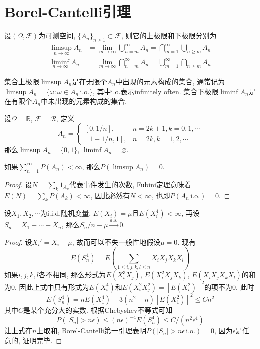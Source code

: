 \documentclass[cn, 12pt, math=mtpro2, bibstyle=apa, blue, twocol]{elegantbook}
\newcommand{\F}{\mathcal{F}}
\newcommand{\R}{\mathbb{R}}
\let\emptyset\varnothing
\begin{document}
\section{Borel-Cantelli引理}
\begin{definition}
设$(\Omega,\F)$为可测空间, $\{A_n\}_{n\ge1}\subset\F$, 则它的上极限和下极限分别为
\begin{align*}
\limsup_{n\to\infty} A_n&=\lim_{m\to\infty}\bigcup_{n=m}^\infty A_n=\bigcap_{m=1}^\infty\bigcup_{n\ge m}A_n \\
\liminf_{n\to\infty} A_n&=\lim_{m\to\infty}\bigcap_{n=m}^\infty A_n=\bigcup_{m=1}^\infty\bigcap_{n\ge m}A_n
\end{align*}
\end{definition}
集合上极限$\limsup A_n$是在无限个$A_n$中出现的元素构成的集合, 通常记为$\limsup A_n=\{\omega:\omega\in A_n\,\text{i.o.}\}$, 其中i.o.表示infinitely often. 集合下极限$\liminf A_n$是在有限个$A_n$中未出现的元素构成的集合.
\begin{example}
设$\Omega=\R$, $\F=\mathcal{R}$, 定义
$$A_n=\begin{cases}
        [0,1/n], & n=2k+1, k=0,1,\cdots \\
        [1-1/n,1], & n=2k, k=1,2,\cdots
      \end{cases}$$
那么$\limsup A_n=\{0,1\}$, $\liminf A_n=\emptyset$.
\end{example}
\begin{theorem}
  如果$\sum_{n=1}^{\infty}P(A_n)<\infty$, 那么$P(\limsup A_n)=0$.
\end{theorem}
\begin{proof}
  设$N=\sum_k1_{A_k}$代表事件发生的次数, Fubini定理意味着$E(N)=\sum_kP(A_k)<\infty$, 因此必然有$N<\infty$, 也即$P(A_n\,\text{i.o.})=0$.
\end{proof}
\begin{theorem}[Borel强大数定律]
  设$X_1,X_2,\cdots$为i.i.d.随机变量, $E(X_i)=\mu$且$E(X_i^4)<\infty$, 再设$S_n=X_1+\cdots+X_n$, 那么$S_n/n-\mu\xrightarrow{a.s.}0$.
\end{theorem}
\begin{proof}
  设$X_i'=X_i-\mu$, 故而可以不失一般性地假设$\mu=0$. 现有
  $$E(S_n^4)=E\left(\sum_{1\leq i,j,k,l\leq n}X_iX_jX_kX_l\right)$$
  如果$i,j,k,l$各不相同, 那么形式为$E(X_i^3X_j)$, $E(X_i^2X_jX_k)$, $E(X_iX_jX_kX_l)$的和为0, 因此上式中只有形式为$E(X_i^4)$和$E(X_i^2X_j^2)=[E(X_i^2)]^2$的项不为0. 此时
  $$E(S_n^4)=nE(X_1^4)+3(n^2-n)[E(X_1^2)]^2\leq Cn^2$$
  其中$C$是某个充分大的实数. 根据Chebyshev不等式可知
  $$P(|S_n|>n\epsilon)\leq (n\epsilon)^{-4}E(S_n^4)\leq C/(n^2\epsilon^4)$$
  让上式在$n$上取和, Borel-Cantelli第一引理表明$P(|S_n|>n\epsilon\,\text{i.o.})=0$, 因为$\epsilon$是任意的, 证明完毕.
\end{proof}
\end{document}
